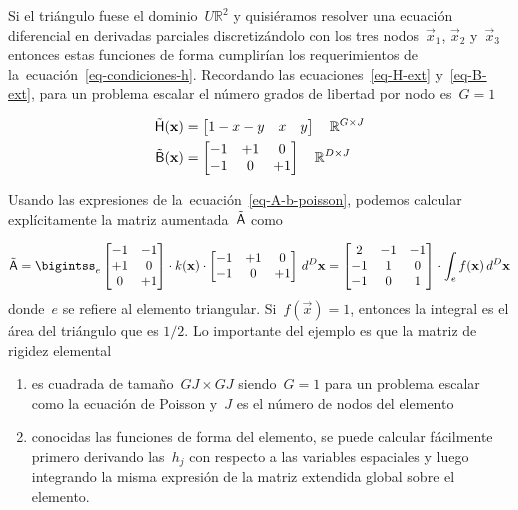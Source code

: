 \documentclass[
  12pt,
  a4paper,
  table]{scrbook}
\providecommand{\tightlist}{%
  \setlength{\itemsep}{0pt}\setlength{\parskip}{0pt}}\usepackage{longtable,booktabs,array}
\theoremstyle{plain}
\theoremstyle{definition}
\theoremstyle{plain}
\theoremstyle{plain}
\theoremstyle{remark}
\begin{document}
Si el triángulo fuese el dominio~\(U \mathbb{R}^2\) y quisiéramos
resolver una ecuación diferencial en derivadas parciales discretizándolo
con los tres nodos~\(\vec{x}_1\), \(\vec{x}_2\) y~\(\vec{x}_3\) entonces
estas funciones de forma cumplirían los requerimientos de
la~ecuación~\ref{eq-condiciones-h}. Recordando las
ecuaciones~\ref{eq-H-ext} y~\ref{eq-B-ext}, para un problema escalar el
número grados de libertad por nodo es~\(G=1\)

\[
\begin{aligned}
\tilde{\mathsf{H}}(\mathbf{x}) &= \begin{bmatrix} 1-x-y & x & y \end{bmatrix}  \quad \mathbb{R}^{G \times J}\\
\tilde{\mathsf{B}}(\mathbf{x}) &= \begin{bmatrix} -1 & +1 & 0 \\ -1 & 0 & +1\end{bmatrix} \quad \mathbb{R}^{D \times J}
\end{aligned}
\]

Usando las expresiones de la~ecuación~\ref{eq-A-b-poisson}, podemos
calcular explícitamente la matriz aumentada~\(\tilde{\mathsf{A}}\) como

\[
\tilde{\mat{A}} = \bigintss_e
\begin{bmatrix}
-1 & -1 \\
+1 & 0 \\
0 & +1 \\
\end{bmatrix}
 \cdot k(\vec{x}) \cdot 
\begin{bmatrix} -1 & +1 & 0 \\ -1 & 0 & +1 \end{bmatrix}
\, d^D\vec{x} \\
=
\begin{bmatrix}
   2  & -1  & -1  \\
  -1  &  1  &  0  \\
  -1  &  0  &  1  \\
\end{bmatrix}
\cdot
\int_e f(\vec{x}) \, d^D\vec{x}
\] donde~\(e\) se refiere al elemento triangular. Si~\(f(\vec{x})=1\),
entonces la integral es el área del triángulo que es \(1/2\). Lo
importante del ejemplo es que la matriz de rigidez elemental

\begin{enumerate}
\def\labelenumi{\arabic{enumi}.}
\tightlist
\item
  es cuadrada de tamaño~\(GJ \times GJ\) siendo~\(G=1\) para un problema
  escalar como la ecuación de Poisson y~\(J\) es el número de nodos del
  elemento
\item
  conocidas las funciones de forma del elemento, se puede calcular
  fácilmente primero derivando las~\(h_j\) con respecto a las variables
  espaciales y luego integrando la misma expresión de la matriz
  extendida global sobre el elemento.
\end{enumerate}
\end{document}
